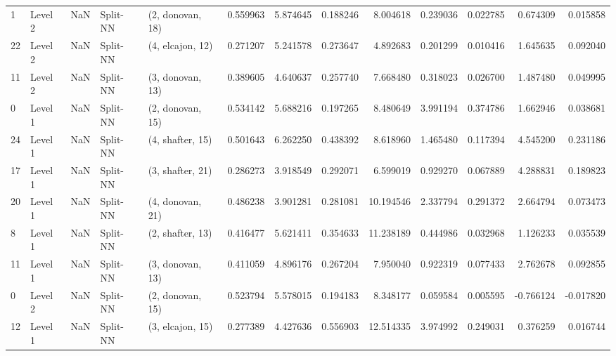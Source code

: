 \begin{tabular}{llrllrrrrrrrr}
1  &   Level 2 &    NaN &       Split-NN &  (2, donovan, 18) &   0.559963 &   5.874645 &  0.188246 &   8.004618 &             0.239036 &               0.022785 &            0.674309 &              0.015858 \\
22 &   Level 2 &    NaN &       Split-NN &  (4, elcajon, 12) &   0.271207 &   5.241578 &  0.273647 &   4.892683 &             0.201299 &               0.010416 &            1.645635 &              0.092040 \\
11 &   Level 2 &    NaN &       Split-NN &  (3, donovan, 13) &   0.389605 &   4.640637 &  0.257740 &   7.668480 &             0.318023 &               0.026700 &            1.487480 &              0.049995 \\
0  &   Level 1 &    NaN &       Split-NN &  (2, donovan, 15) &   0.534142 &   5.688216 &  0.197265 &   8.480649 &             3.991194 &               0.374786 &            1.662946 &              0.038681 \\
24 &   Level 1 &    NaN &       Split-NN &  (4, shafter, 15) &   0.501643 &   6.262250 &  0.438392 &   8.618960 &             1.465480 &               0.117394 &            4.545200 &              0.231186 \\
17 &   Level 1 &    NaN &       Split-NN &  (3, shafter, 21) &   0.286273 &   3.918549 &  0.292071 &   6.599019 &             0.929270 &               0.067889 &            4.288831 &              0.189823 \\
20 &   Level 1 &    NaN &       Split-NN &  (4, donovan, 21) &   0.486238 &   3.901281 &  0.281081 &  10.194546 &             2.337794 &               0.291372 &            2.664794 &              0.073473 \\
8  &   Level 1 &    NaN &       Split-NN &  (2, shafter, 13) &   0.416477 &   5.621411 &  0.354633 &  11.238189 &             0.444986 &               0.032968 &            1.126233 &              0.035539 \\
11 &   Level 1 &    NaN &       Split-NN &  (3, donovan, 13) &   0.411059 &   4.896176 &  0.267204 &   7.950040 &             0.922319 &               0.077433 &            2.762678 &              0.092855 \\
0  &   Level 2 &    NaN &       Split-NN &  (2, donovan, 15) &   0.523794 &   5.578015 &  0.194183 &   8.348177 &             0.059584 &               0.005595 &           -0.766124 &             -0.017820 \\
12 &   Level 1 &    NaN &       Split-NN &  (3, elcajon, 15) &   0.277389 &   4.427636 &  0.556903 &  12.514335 &             3.974992 &               0.249031 &            0.376259 &              0.016744 \\

\end{tabular}
